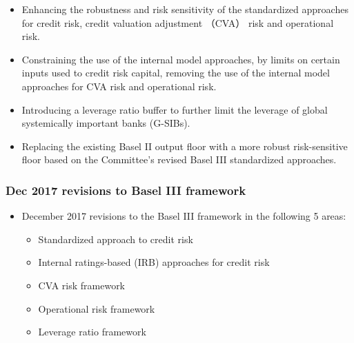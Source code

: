 \begin{itemize}
\begin{itemize}
    \item Enhancing the robustness and risk sensitivity of the standardized approaches for credit risk, credit valuation adjustment （CVA） risk and operational risk.
    \item Constraining the use of the internal model approaches, by limits on certain inputs used to credit risk capital, removing the use of the internal model approaches for CVA risk and operational risk.
    \item Introducing a leverage ratio buffer to further limit the leverage of global systemically important banks (G-SIBs).
    \item Replacing the existing Basel II output floor with a more robust risk-sensitive floor based on the Committee's revised Basel III standardized approaches.
    \end{itemize}
\end{itemize}



\subsubsection{Dec 2017 revisions to Basel III framework}
\begin{itemize}
\item December 2017 revisions to the Basel III framework in the following 5 areas:
    \begin{itemize}
    \item Standardized approach to credit risk
    \item Internal ratings-based (IRB) approaches for credit risk
    \item CVA risk framework
    \item Operational risk framework
    \item Leverage ratio framework
    \end{itemize}

\end{itemize}



